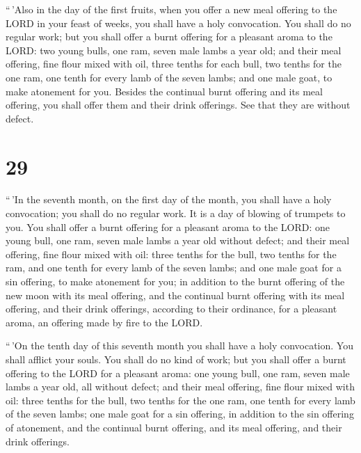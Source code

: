  ``\,'Also in the day of the first fruits, when you offer
a new meal offering to the LORD in your feast of weeks, you shall have a
holy convocation. You shall do no regular work;  but you
shall offer a burnt offering for a pleasant aroma to the LORD: two young
bulls, one ram, seven male lambs a year old;  and their
meal offering, fine flour mixed with oil, three tenths for each bull,
two tenths for the one ram,  one tenth for every lamb of
the seven lambs;  and one male goat, to make atonement
for you.  Besides the continual burnt offering and its
meal offering, you shall offer them and their drink offerings. See that
they are without defect.

\hypertarget{section-28}{%
\section{29}\label{section-28}}

 ``\,'In the seventh month, on the first day of the month,
you shall have a holy convocation; you shall do no regular work. It is a
day of blowing of trumpets to you.  You shall offer a
burnt offering for a pleasant aroma to the LORD: one young bull, one
ram, seven male lambs a year old without defect;  and
their meal offering, fine flour mixed with oil: three tenths for the
bull, two tenths for the ram,  and one tenth for every
lamb of the seven lambs;  and one male goat for a sin
offering, to make atonement for you;  in addition to the
burnt offering of the new moon with its meal offering, and the continual
burnt offering with its meal offering, and their drink offerings,
according to their ordinance, for a pleasant aroma, an offering made by
fire to the LORD.

 ``\,'On the tenth day of this seventh month you shall
have a holy convocation. You shall afflict your souls. You shall do no
kind of work;  but you shall offer a burnt offering to the
LORD for a pleasant aroma: one young bull, one ram, seven male lambs a
year old, all without defect;  and their meal offering,
fine flour mixed with oil: three tenths for the bull, two tenths for the
one ram,  one tenth for every lamb of the seven lambs;
 one male goat for a sin offering, in addition to the sin
offering of atonement, and the continual burnt offering, and its meal
offering, and their drink offerings.

